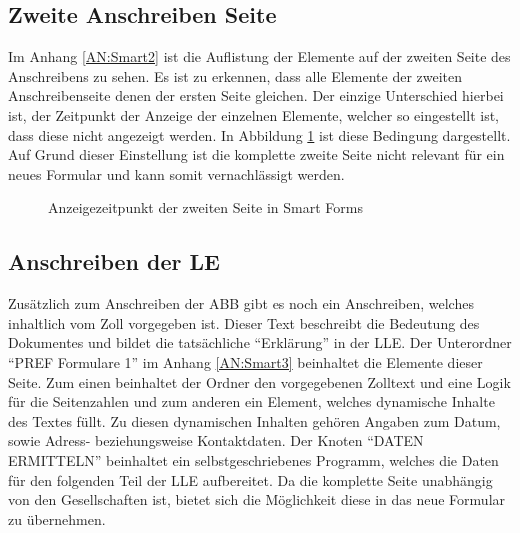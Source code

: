 	\subsection{Zweite Anschreiben Seite}
	
	Im Anhang \ref{AN:Smart2} ist die Auflistung der Elemente auf der zweiten Seite des Anschreibens zu sehen. Es ist zu erkennen, dass alle Elemente der zweiten Anschreibenseite denen der ersten Seite gleichen. Der einzige Unterschied hierbei ist, der Zeitpunkt der Anzeige der einzelnen Elemente, welcher so eingestellt ist, dass diese nicht angezeigt werden. In Abbildung \ref{beding_smart} ist diese Bedingung dargestellt. Auf Grund dieser Einstellung ist die komplette zweite Seite nicht relevant für ein neues Formular und kann somit vernachlässigt werden.
	
	\begin{figure}[ht]
		\centering
		\caption{Anzeigezeitpunkt der zweiten Seite in Smart Forms}
		\label{beding_smart}
	\end{figure}
	
	\subsection{Anschreiben der \acs{LE}}
	\label{ist:le}
	
	Zusätzlich zum Anschreiben der ABB gibt es noch ein Anschreiben, welches inhaltlich vom Zoll vorgegeben ist. Dieser Text beschreibt die Bedeutung des Dokumentes und bildet die tatsächliche "`Erklärung"' in der \ac{LLE}. Der Unterordner "`PREF Formulare 1"' im Anhang \ref{AN:Smart3} beinhaltet die Elemente dieser Seite. Zum einen beinhaltet der Ordner den vorgegebenen Zolltext und eine Logik für die Seitenzahlen und zum anderen ein Element, welches dynamische Inhalte des Textes füllt. Zu diesen dynamischen Inhalten gehören Angaben zum Datum, sowie Adress- beziehungsweise Kontaktdaten. Der Knoten "`DATEN ERMITTELN"' beinhaltet ein selbstgeschriebenes Programm, welches die Daten für den folgenden Teil der \ac{LLE} aufbereitet. Da die komplette Seite unabhängig von den Gesellschaften ist, bietet sich die Möglichkeit diese in das neue Formular zu übernehmen. 
	
